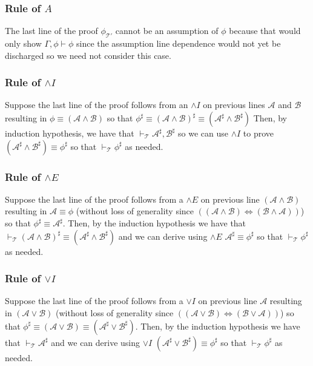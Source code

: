 \documentclass[12pt]{article}
\newcommand{\bv}[1]{\boldsymbol{#1}}
\newcommand{\mc}[1]{\mathcal{#1}}
\newcommand{\bc}[1]{\bv{\mc{#1}}}
\begin{document}
\hrulefill
\subsubsection{Rule of $A$}
The last line of the proof $\phi_{\bc{T}'}$ cannot be an assumption of $\phi$ because that would only show $\Gamma,\phi \vdash \phi$ since the assumption line dependence would not yet be discharged so we need not consider this case.

\hrulefill

\subsubsection*{Rule of $\land I$}
Suppose the last line of the proof follows from an $\land I$ on previous lines $\mc{A}$ and $\mc{B}$ resulting in $\phi \equiv (\mc{A} \land \mc{B})$ so that $\phi^{\sharp} \equiv (\mc{A} \land \mc{B})^{\sharp} \equiv (\mc{A}^{\sharp}\land \mc{B}^{\sharp})$ Then, by induction hypothesis, we have that $\vdash_{\bc{T}} \mc{A}^{\sharp}, \mc{B}^{\sharp}$ so we can use $\land I$ to prove $(\mc{A}^{\sharp} \land \mc{B}^{\sharp}) \equiv \phi^{\sharp}$ so that $\vdash_{\bc{T}} \phi^{\sharp}$ as needed.

\hrulefill

\subsubsection*{Rule of $\land E$}
Suppose the last line of the proof follows from a $\land E$ on previous line $(\mc{A} \land \mc{B})$ resulting in $\mc{A}\equiv\phi$ (without loss of generality since $((\mc{A} \land \mc{B}) \Leftrightarrow (\mc{B} \land \mc{A}))$) so that $\phi^{\sharp} \equiv \mc{A}^{\sharp}$. Then, by the induction hypothesis we have that $\vdash_{\bc{T}}(\mc{A}\land\mc{B})^{\sharp}\equiv (\mc{A}^{\sharp} \land \mc{B}^{\sharp})$ and we can derive using $\land E$ $\mc{A}^{\sharp} \equiv \phi^{\sharp}$ so that $\vdash_{\bc{T}} \phi^{\sharp}$ as needed.

\hrulefill

\subsubsection*{Rule of $\lor I$}
Suppose the last line of the proof follows from a $\lor I$ on previous line $\mc{A}$ resulting in $(\mc{A} \lor \mc{B})$ (without loss of generality since $((\mc{A}\lor \mc{B})\Leftrightarrow(\mc{B} \lor \mc{A}))$) so that $\phi^{\sharp} \equiv (\mc{A} \lor \mc{B}) \equiv (\mc{A}^{\sharp} \lor \mc{B}^{\sharp})$. Then, by the induction hypothesis we have that $\vdash_{\bc{T}}\mc{A}^{\sharp}$ and we can derive using $\lor I$ $(\mc{A}^{\sharp} \lor \mc{B}^{\sharp}) \equiv \phi^{\sharp}$ so that $\vdash_{\bc{T}}\phi^{\sharp}$ as needed.
\end{document}
